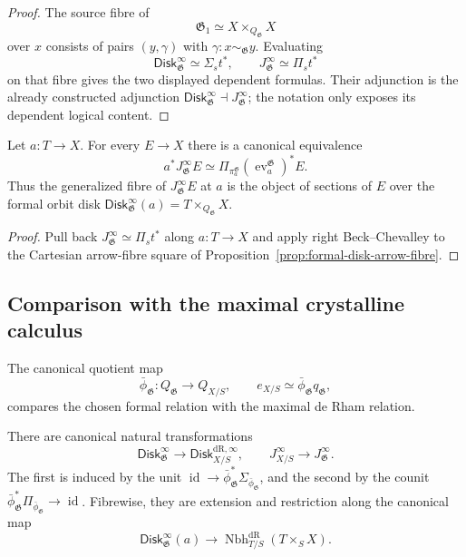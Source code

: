 \begin{proof}
The source fibre of
\[
    \mathfrak G_1\simeq X\times_{Q_{\mathfrak G}}X
\]
over $x$ consists of pairs $(y,\gamma)$ with
$\gamma:x\sim_{\mathfrak G}y$.  Evaluating
\[
    \mathsf{Disk}^{\infty}_{\mathfrak G}
    \simeq
    \Sigma_s t^*,
    \qquad
    J^\infty_{\mathfrak G}
    \simeq
    \Pi_s t^*
\]
on that fibre gives the two displayed dependent formulas.  Their adjunction
is the already constructed adjunction
$\mathsf{Disk}^{\infty}_{\mathfrak G}\dashv J^\infty_{\mathfrak G}$; the notation only
exposes its dependent logical content.
\end{proof}

\begin{proposition}
\label{prop:formal-groupoid-fibrewise-jets}
Let $a:T\to X$.  For every $E\to X$ there is a canonical equivalence
\[
    a^*J^\infty_{\mathfrak G}E
    \simeq
    \Pi_{\pi^{\mathfrak G}_a}
    \left(\operatorname{ev}^{\mathfrak G}_a\right)^*E.
\]
Thus the generalized fibre of $J^\infty_{\mathfrak G}E$ at $a$ is the object of
sections of $E$ over the formal orbit disk
$\mathsf{Disk}^{\infty}_{\mathfrak G}(a)=T\times_{Q_{\mathfrak G}}X$.
\end{proposition}

\begin{proof}
Pull back $J^\infty_{\mathfrak G}\simeq\Pi_s t^*$ along $a:T\to X$ and apply right
Beck--Chevalley to the Cartesian arrow-fibre square of
Proposition~\ref{prop:formal-disk-arrow-fibre}.
\end{proof}

\subsection{Comparison with the maximal crystalline calculus}

The canonical quotient map
\[
    \bar\phi_{\mathfrak G}:Q_{\mathfrak G}\longrightarrow Q_{X/S},
    \qquad
    e_{X/S}\simeq \bar\phi_{\mathfrak G}q_{\mathfrak G},
\]
compares the chosen formal relation with the maximal de Rham relation.

\begin{proposition}
\label{prop:formal-groupoid-ambient-monad-comonad}
There are canonical natural transformations
\[
    \mathsf{Disk}^{\infty}_{\mathfrak G}
    \longrightarrow
    \mathsf{Disk}^{\mathrm{dR},\infty}_{X/S},
    \qquad
    J^\infty_{X/S}\longrightarrow J^\infty_{\mathfrak G}.
\]
The first is induced by the unit
$\operatorname{id}\to \bar\phi_{\mathfrak G}^*\Sigma_{\bar\phi_{\mathfrak G}}$, and the
second by the counit
$\bar\phi_{\mathfrak G}^*\Pi_{\bar\phi_{\mathfrak G}}\to\operatorname{id}$.  Fibrewise,
they are extension and restriction along the canonical map
\[
    \mathsf{Disk}^{\infty}_{\mathfrak G}(a)
    \longrightarrow
    \operatorname{Nbh}^{\mathrm{dR}}_{T/S}(T\times_SX).
\]
\end{proposition}

